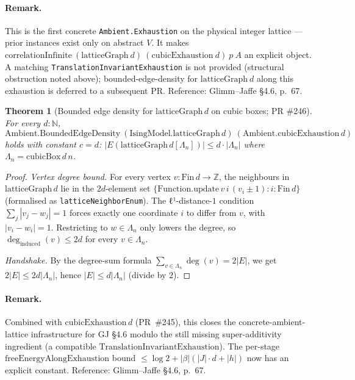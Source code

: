 \documentclass[a4paper,11pt]{article}
\newtheorem{theorem}{Theorem}
\begin{document}
\paragraph{Remark.} This is the first concrete
\texttt{Ambient.Exhaustion} on the physical integer lattice — prior
instances exist only on abstract $V$. It makes
$\mathrm{correlationInfinite}\ (\mathrm{latticeGraph}\ d)\
(\mathrm{cubicExhaustion}\ d)\ p\ A$ an explicit object. A matching
\texttt{TranslationInvariantExhaustion} is not provided (structural
obstruction noted above); bounded-edge-density for
$\mathrm{latticeGraph}\ d$ along this exhaustion is deferred to a
subsequent PR.
Reference: Glimm--Jaffe \cite{glimm-jaffe} \S 4.6, p.~67.

\begin{theorem}[Bounded edge density for $\mathrm{latticeGraph}\,d$
on cubic boxes; PR \#246]
For every $d : \mathbb{N}$,
\[
  \mathrm{Ambient.BoundedEdgeDensity}\ (\mathrm{IsingModel.latticeGraph}\,d)\
  (\mathrm{Ambient.cubicExhaustion}\,d)
\]
holds with constant $c = d$: $|E(\mathrm{latticeGraph}\,d[\Lambda_n])| \le
d \cdot |\Lambda_n|$ where $\Lambda_n = \mathrm{cubicBox}\,d\,n$.
\end{theorem}
\begin{proof}
\emph{Vertex degree bound.} For every vertex $v : \mathrm{Fin}\,d \to \mathbb{Z}$,
the neighbours in $\mathrm{latticeGraph}\,d$ lie in the $2d$-element set
$\{\mathrm{Function.update}\,v\,i\,(v_i \pm 1) : i : \mathrm{Fin}\,d\}$
(formalised as \texttt{latticeNeighborEnum}). The ℓ¹-distance-$1$ condition
$\sum_j |v_j - w_j| = 1$ forces exactly one coordinate $i$ to differ from $v$,
with $|v_i - w_i| = 1$. Restricting to $w \in \Lambda_n$ only lowers the
degree, so $\deg_{\mathrm{induced}}(v) \le 2d$ for every $v \in \Lambda_n$.

\emph{Handshake.} By the degree-sum formula
$\sum_{v \in \Lambda_n} \deg(v) = 2|E|$, we get
$2|E| \le 2d |\Lambda_n|$, hence $|E| \le d |\Lambda_n|$ (divide by $2$).
\end{proof}

\paragraph{Remark.}
Combined with $\mathrm{cubicExhaustion}\,d$ (PR~\#245), this closes the
concrete-ambient-lattice infrastructure for GJ \S 4.6 modulo the still
missing super-additivity ingredient (a compatible
$\mathrm{TranslationInvariantExhaustion}$). The per-stage
$\mathrm{freeEnergyAlongExhaustion}$ bound
$\le \log 2 + |\beta|(|J|\cdot d + |h|)$ now has an explicit constant.
Reference: Glimm--Jaffe \cite{glimm-jaffe} \S 4.6, p.~67.
\end{document}
